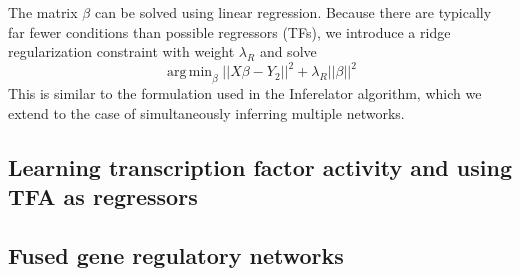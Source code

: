 \documentclass[11pt]{article}
\DeclareMathOperator*{\argmin}{arg\,min}
\begin{document}
\noindent The matrix $\beta$ can be solved using linear regression. Because there are typically far fewer conditions than possible regressors (TFs), we introduce a ridge regularization constraint with weight $\lambda_R$ and solve
\begin{equation}
\argmin_\beta\vert \vert X\beta - Y_2 \vert \vert ^2 + \lambda_R \vert \vert \beta \vert \vert ^2
\end{equation}
This is similar to the formulation used in the Inferelator algorithm, which we extend to the case of simultaneously inferring multiple networks. 
\subsection{Learning transcription factor activity and using TFA as regressors}

\subsection{Fused gene regulatory networks}
\end{document}
